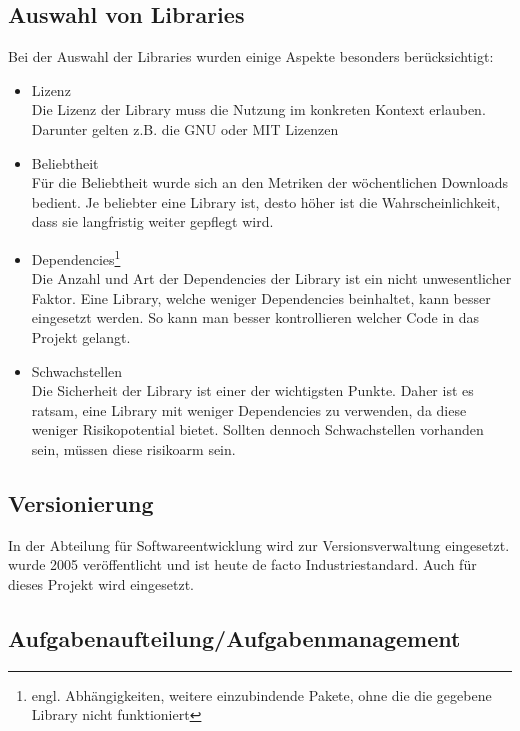 \subsection{Auswahl von Libraries}
\label{sec:Durchführungsphase:AuswahlVonLibraries}

Bei der Auswahl der Libraries wurden einige Aspekte besonders berücksichtigt:

\begin{itemize}
    \item Lizenz\\
    Die Lizenz der Library muss die Nutzung im konkreten Kontext erlauben. Darunter gelten z.B. die GNU oder MIT Lizenzen
    \item Beliebtheit\\
    Für die Beliebtheit wurde sich an den Metriken der wöchentlichen Downloads bedient. Je beliebter eine Library ist, desto höher ist die Wahrscheinlichkeit, dass sie langfristig weiter gepflegt wird.
    \item Dependencies\footnote{engl. Abhängigkeiten, weitere einzubindende Pakete, ohne die die gegebene Library nicht funktioniert}\\
	Die Anzahl und Art der Dependencies der Library ist ein nicht unwesentlicher Faktor. Eine Library, welche weniger Dependencies beinhaltet, kann besser eingesetzt werden. So kann man besser kontrollieren welcher Code in das Projekt gelangt.
	\item Schwachstellen\\
	Die Sicherheit der Library ist einer der wichtigsten Punkte. Daher ist es ratsam, eine Library mit weniger Dependencies zu verwenden, da diese weniger Risikopotential bietet. Sollten dennoch Schwachstellen vorhanden sein, müssen diese risikoarm sein.
\end{itemize}

\subsection{Versionierung}

In der Abteilung für Softwareentwicklung wird  zur Versionsverwaltung eingesetzt.  wurde 2005 veröffentlicht und ist heute de facto Industriestandard. Auch für dieses Projekt wird  eingesetzt.

\subsection{Aufgabenaufteilung/Aufgabenmanagement}


